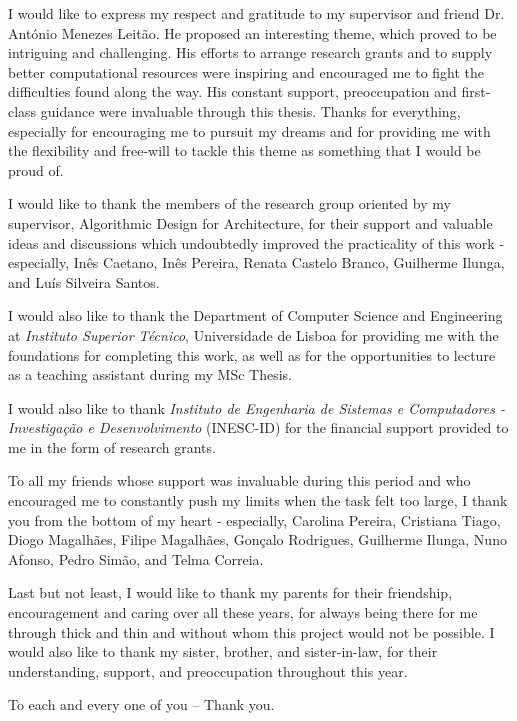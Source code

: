 
I would like to express my respect and gratitude to my supervisor and friend Dr. António Menezes Leitão. He proposed an interesting theme, which proved to be intriguing and challenging. His efforts to arrange research grants and to supply better computational resources were inspiring and encouraged me to fight the difficulties found along the way. His constant support, preoccupation and first-class guidance were invaluable through this thesis. Thanks for everything, especially for encouraging me to pursuit my dreams and for providing me with the flexibility and free-will to tackle this theme as something that I would be proud of.  

I would like to thank the members of the research group oriented by my supervisor, Algorithmic Design for Architecture, for their support and valuable ideas and discussions which undoubtedly improved the practicality of this work - especially, Inês Caetano, Inês Pereira, Renata Castelo Branco, Guilherme Ilunga, and Luís Silveira Santos. 

I would also like to thank the Department of Computer Science and Engineering at \textit{Instituto Superior Técnico}, Universidade de Lisboa for providing me with the foundations for completing this work, as well as for the opportunities to lecture as a teaching assistant during my MSc Thesis. 

I would also like to thank \textit{Instituto de Engenharia de Sistemas e Computadores - Investigação e Desenvolvimento} (INESC-ID) for the financial support provided to me in the form of research grants.


To all my friends whose support was invaluable during this period and who encouraged me to constantly push my limits when the task felt too large, I thank you from the bottom of my heart - especially, Carolina Pereira, Cristiana Tiago, Diogo Magalhães, Filipe Magalhães, Gonçalo Rodrigues, Guilherme Ilunga, Nuno Afonso, Pedro Simão, and Telma Correia.

Last but not least, I would like to thank my parents for their friendship, encouragement and caring over all these years, for always being there for me through thick and thin and without whom this project would not be possible. I would also like to thank my sister, brother, and sister-in-law, for their understanding, support, and preoccupation throughout this year.

To each and every one of you -- Thank you.